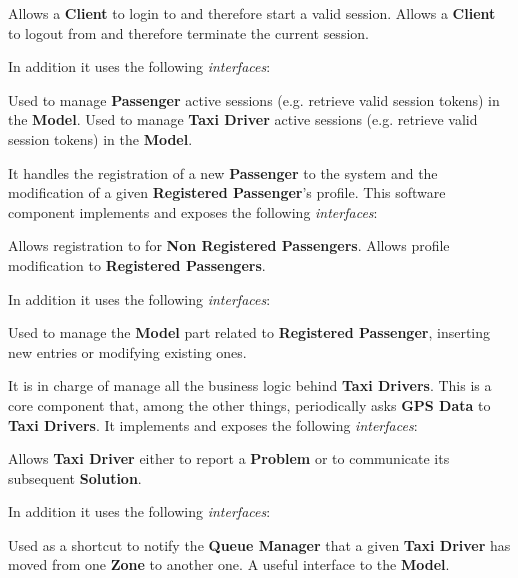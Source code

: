 \begin{itemize}
\begin{itemize}
		\begin{itemize}
			 Allows a \textbf{Client} to login to \myTaxiService{} and therefore start a valid session.
			 Allows a \textbf{Client} to logout from \myTaxiService{} and therefore terminate the current session.
		\end{itemize}
		In addition it uses the following \textit{interfaces}:
		\begin{itemize}
			 Used to manage \textbf{Passenger} active sessions (e.g. retrieve valid session tokens) in the \textbf{Model}.
			 Used to manage \textbf{Taxi Driver} active sessions (e.g. retrieve valid session tokens) in the \textbf{Model}.
		\end{itemize}
		\itemBold{Profile Manager}
		It handles the registration of a new \textbf{Passenger} to the system and the modification of a given \textbf{Registered Passenger}'s profile.
		This software component implements and exposes the following \textit{interfaces}:
		\begin{itemize}
			 Allows registration to \myTaxiService{} for \textbf{Non Registered Passengers}.
			 Allows profile modification to \textbf{Registered Passengers}.
		\end{itemize}
		In addition it uses the following \textit{interfaces}:
		\begin{itemize}
			 Used to manage the \textbf{Model} part related to \textbf{Registered Passenger}, inserting new entries or modifying existing ones.
		\end{itemize}
		 It is in charge of manage all the business logic behind \textbf{Taxi Drivers}.
		This is a core component that, among the other things, periodically asks \textbf{GPS Data} to \textbf{Taxi Drivers}.
		It implements and exposes the following \textit{interfaces}:
		\begin{itemize}
			 Allows \textbf{Taxi Driver} either to report a \textbf{Problem} or to communicate its subsequent \textbf{Solution}.
		\end{itemize}
		In addition it uses the following \textit{interfaces}:
		\begin{itemize}
			 Used as a shortcut to notify the \textbf{Queue Manager} that a given \textbf{Taxi Driver} has moved from one \textbf{Zone} to another one.
			 A useful interface to the \textbf{Model}.

\end{itemize}
\end{itemize}
\end{itemize}
